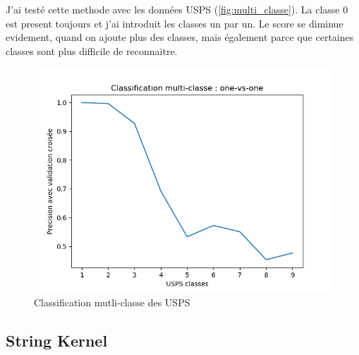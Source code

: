 \documentclass[a4paper,12pt]{article}
\begin{document}
J'ai testé cette methode avec les données USPS (\autoref{fig:multi_classe}). La classe 0 est present toujours et j'ai introduit les classes un par un.
Le score se diminue evidement, quand on ajoute plus des classes, mais également parce que certaines classes sont plus difficile de reconnaitre.

\begin{figure}[h!]
\caption{Classification mutli-classe des USPS}
\label{fig:multi_classe}
\includegraphics[width=0.5\linewidth]{images/tme5/multi_classe.png}
\centering
\end{figure}%

\subsection{String Kernel}



\end{document}
